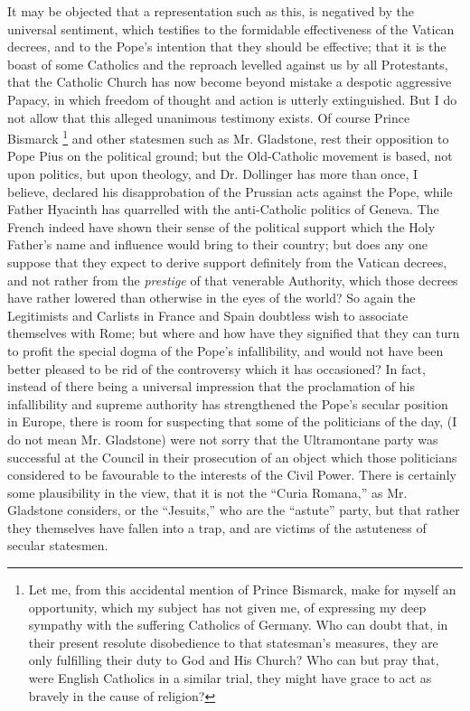 It may be objected that a representation such as this, is negatived
by the universal sentiment, which testifies to the formidable
effectiveness of the Vatican decrees, and to the Pope's intention that
they should be effective; that it is the boast of some Catholics and the
reproach levelled against us by all Protestants, that the Catholic
Church has now become beyond mistake a despotic aggressive Papacy, in
which freedom of thought and action is utterly extinguished. But I do
not allow that this alleged unanimous testimony exists. Of course Prince
Bismarck \footnote{Let me, from this accidental mention of Prince Bismarck, make for
myself an opportunity, which my subject has not given me, of expressing
my deep sympathy with the suffering Catholics of Germany. Who can doubt
that, in their present resolute disobedience to that statesman's
measures, they are only fulfilling their duty to God and His Church? Who
can but pray that, were English Catholics in a similar trial, they might
have grace to act as bravely in the cause of religion?} and other
statesmen such as Mr. Gladstone, rest their opposition to Pope
Pius on the political ground; but the Old-Catholic movement is based,
not upon politics, but upon theology, and Dr. Dollinger has more than
once, I believe, declared his disapprobation of the Prussian acts
against the Pope, while Father Hyacinth has quarrelled with the
anti-Catholic politics of Geneva. The French indeed have shown their
sense of the political support which the Holy Father's name and
influence would bring to their country; but does any one suppose that
they expect to derive support definitely from the Vatican decrees, and
not rather from the \emph{prestige} of that venerable Authority, which
those decrees have rather lowered than otherwise in the eyes of the
world? So again the Legitimists and Carlists in France and Spain
doubtless wish to associate themselves with Rome; but where and how have
they signified that they can turn to profit the special dogma of the
Pope's infallibility, and would not have been better pleased to be rid
of the controversy which it has occasioned? In fact, instead of there
being a universal impression that the proclamation of his infallibility
and supreme authority has strengthened the Pope's secular position in
Europe, there is room for suspecting that some of the politicians of the
day, (I do not mean Mr. Gladstone) were not sorry that the Ultramontane
party was successful at the Council in their prosecution of an object
which those politicians considered to be favourable to the interests of
the Civil Power. There is certainly some plausibility in the view, that
it is not the ``Curia Romana,'' as Mr. Gladstone considers, or
the ``Jesuits,'' who are the ``astute'' party, but that
rather they themselves have fallen into a trap, and are victims of
the astuteness of secular statesmen.


